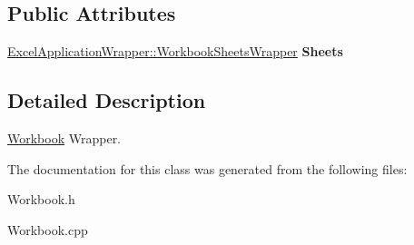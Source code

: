 \subsection*{Public Attributes}
\begin{DoxyCompactItemize}
\item 
\hypertarget{class_excel_application_wrapper_1_1_workbook_ad55fcef7855c3ac7b801c776b9042deb}{}\hyperlink{class_excel_application_wrapper_1_1_workbook_sheets_wrapper}{Excel\+Application\+Wrapper\+::\+Workbook\+Sheets\+Wrapper} {\bfseries Sheets}\label{class_excel_application_wrapper_1_1_workbook_ad55fcef7855c3ac7b801c776b9042deb}

\end{DoxyCompactItemize}


\subsection{Detailed Description}
\hyperlink{class_excel_application_wrapper_1_1_workbook}{Workbook} Wrapper. 

The documentation for this class was generated from the following files\+:\begin{DoxyCompactItemize}
\item 
Workbook.\+h\item 
Workbook.\+cpp\end{DoxyCompactItemize}
